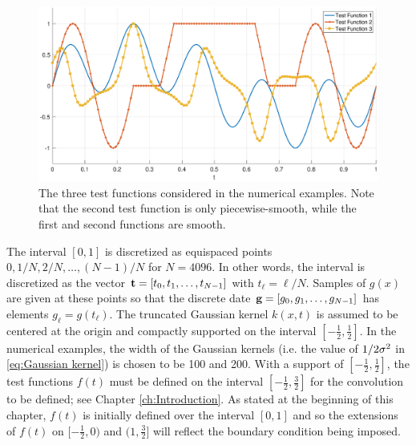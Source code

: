 \begin{figure}
	\centerline{\includegraphics[scale = 0.45]{Figures/TestFunctions1D.eps}}
\caption{The three test functions considered in the numerical examples. Note that the second test function is only piecewise-smooth, while the first and second functions are smooth.}
\label{TestFunctions}
\end{figure}

The interval $[0,1]$ is discretized as equispaced points $0, 1/N, 2/N, \ldots, (N-1)/N$ for $N = 4096$. In other words, the interval is discretized as the vector $\mathbf{t} = [t_0,t_1,\ldots,t_{N-1}]$ with $t_\ell = \ell/N$. Samples of $g(x)$ are given at these points so that the discrete date $\mathbf{g} = [g_0,g_1,\ldots,g_{N-1}]$ has elements $g_\ell = g(t_\ell)$. The truncated Gaussian kernel $k(x,t)$ is assumed to be centered at the origin and compactly supported on the interval $[-\frac{1}{2},\frac{1}{2}]$. In the numerical examples, the width of the Gaussian kernels (i.e. the value of $1/2\sigma^2$ in \eqref{eq:Gaussian kernel}) is chosen to be 100 and 200. With a support of $[-\frac{1}{2},\frac{1}{2}]$, the test functions $f(t)$ must be defined on the interval $[-\frac{1}{2},\frac{3}{2}]$ for the convolution to be defined; see Chapter \ref{ch:Introduction}. As stated at the beginning of this chapter, $f(t)$ is initially defined over the interval $[0,1]$ and so the extensions of $f(t)$ on $[-\frac{1}{2},0)$ and $(1,\frac{3}{2}]$ will reflect the boundary condition being imposed.


